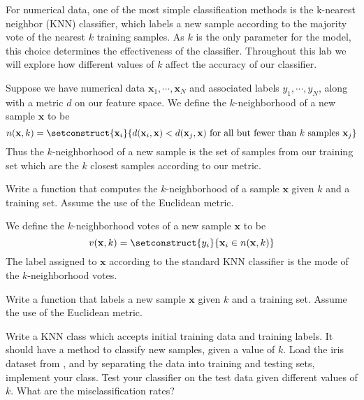 
For numerical data, one of the most simple classification methods is the 
k-nearest neighbor (KNN) classifier, which labels a new sample according 
to the majority vote of the nearest $k$ training samples. 
As $k$ is the only parameter for the model, this choice determines the effectiveness of the classifier. 
Throughout this lab we will explore how different values of $k$ affect the accuracy of our classifier.

Suppose we have numerical data $\mathbf{x}_{1}, \cdots, \mathbf{x}_{N}$ and 
associated labels $y_{1}, \cdots, y_{N}$, along with a metric $d$ on our feature space. 
We define the $k$-neighborhood of a new sample $\mathbf{x}$ to be 
\begin{equation*}
n(\mathbf{x},k) = 
\setconstruct{\mathbf{x}_{i}}{d(\mathbf{x}_{i}, \mathbf{x}) < d(\mathbf{x}_{j}, 
\mathbf{x}) \text{ for all but fewer than } k \text{ samples } \mathbf{x}_{j}}
\end{equation*}
Thus the $k$-neighborhood of a new sample is the set of samples from our training set 
which are the $k$ closest samples according to our metric.

\begin{problem}
Write a function that computes the $k$-neighborhood of a sample 
$\mathbf{x}$ given $k$ and a training set. Assume the use of the Euclidean metric.
\end{problem}

We define the $k$-neighborhood votes of a new sample $\mathbf{x}$ to be 
\begin{equation*}
v(\mathbf{x},k) = \setconstruct{y_{i}}{\mathbf{x}_{i} \in n(\mathbf{x},k)}
\end{equation*}
The label assigned to $\mathbf{x}$ according to the standard KNN classifier is the mode of the $k$-neighborhood votes.

\begin{problem}
Write a function that labels a new sample $\mathbf{x}$ given $k$ and a training set. Assume the use of the Euclidean metric.
\end{problem}

\begin{problem}
Write a KNN class which accepts initial training data and training labels. 
It should have a method to classify new samples, given a value of $k$. 
Load the iris dataset from , and by separating the data into training and testing sets, 
implement your class. Test your classifier on the test data given different values of $k$. 
What are the misclassification rates?
\end{problem}

